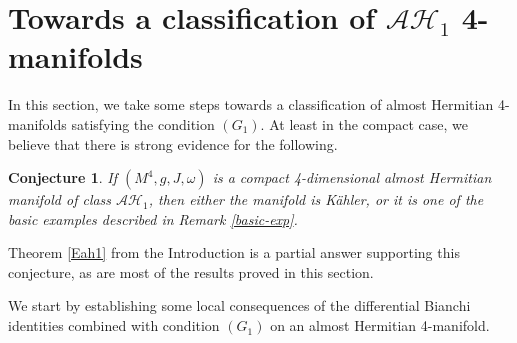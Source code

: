 \documentclass{amsart}
\newtheorem{conj}[theorem]{Conjecture}
\begin{document}
\section{Towards a classification of $\mathcal{AH}_1$ 4-manifolds}

In this section, we take some steps towards a classification of almost Hermitian 4-manifolds satisfying the condition $(G_1)$. At least in the compact case, we believe that there is strong evidence for the following.



\begin{conj} \label{conjecture}
If $(M^4, g, J, \omega)$ is a compact 4-dimensional almost Hermitian manifold of class $\mathcal{AH}_1$, then either the manifold is K\"ahler, or it is one of the basic examples described in Remark \ref{basic-exp}. %
\end{conj}
\noindent
Theorem \ref{Eah1} from the Introduction is a partial answer supporting this conjecture, as are most of the results proved in this section. 



\vspace{0.2cm}
\noindent
We start by establishing some local consequences of the differential Bianchi identities combined with condition $(G_1)$ on an almost Hermitian 4-manifold.
\end{document}
